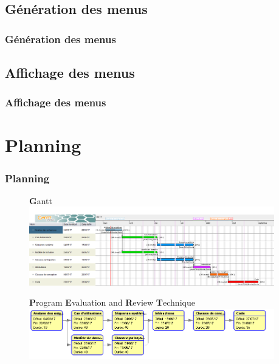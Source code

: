 \documentclass{beamer}
\begin{document}
\subsection{Génération des menus}
\begin{frame}
\frametitle{Génération des menus}

\end{frame}

\subsection{Affichage des menus}
\begin{frame}
\frametitle{Affichage des menus}

\end{frame}

\section{Planning}
\begin{frame}[label=planning]
\frametitle{Planning}
\begin{figure}[H]
\textbf{G}antt
\label{Gantt}
  \centering
      \includegraphics[width=0.95\textwidth]{Vitameal_gantt.png} %
\end{figure}

\begin{figure}[H]
\textbf{P}rogram \textbf{E}valuation and \textbf{R}eview \textbf{T}echnique
\label{PERT}
  \centering
      \includegraphics[width=0.95\textwidth]{Vitameal_pert.png} %
\end{figure}
\end{frame}
\end{document}
